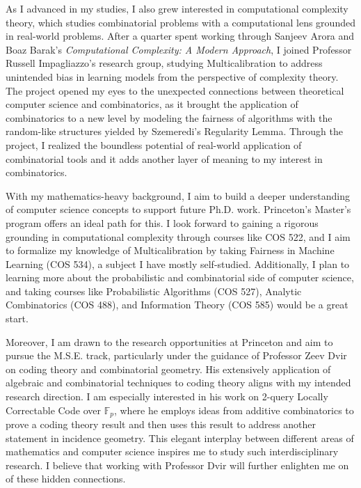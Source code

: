 \documentclass[12pt]{article}
\begin{document}
As I advanced in my studies, I also grew interested in computational complexity theory, which
studies combinatorial problems with a computational lens grounded in real-world problems. After a
quarter spent working through Sanjeev Arora and Boaz Barak's \textit{Computational Complexity: A
Modern Approach}\cite{arora2009computational}, I joined Professor Russell Impagliazzo's research
group, studying Multicalibration to address unintended bias in learning models from the perspective
of complexity theory. The project opened my eyes to the unexpected connections between theoretical
computer science and combinatorics, as it brought the application of combinatorics to a new level by
modeling the fairness of algorithms with the random-like structures yielded by Szemeredi's
Regularity Lemma. Through the project, I realized the boundless potential of real-world application
of combinatorial tools and it adds another layer of meaning to my interest in combinatorics.

With my mathematics-heavy background, I aim to build a deeper understanding of computer science
concepts to support future Ph.D. work. Princeton's Master's program offers an ideal path for this. I
look forward to gaining a rigorous grounding in computational complexity through courses like COS
522, and I aim to formalize my knowledge of Multicalibration by taking Fairness in Machine Learning
(COS 534), a subject I have mostly self-studied. Additionally, I plan to learning more about the
probabilistic and combinatorial side of computer science, and taking courses like Probabilistic
Algorithms (COS 527), Analytic Combinatorics (COS 488), and Information Theory (COS 585) would be a
great start.

Moreover, I am drawn to the research opportunities at Princeton and aim to pursue the M.S.E. track,
particularly under the guidance of Professor Zeev Dvir on coding theory and combinatorial geometry.
His extensively application of algebraic and combinatorial techniques to coding theory aligns with
my intended research direction. I am especially interested in his work on 2-query Locally
Correctable Code over $\mathbb{F}_p$\cite{6108225}, where he employs ideas from additive
combinatorics to prove a coding theory result and then uses this result to address another statement
in incidence geometry. This elegant interplay between different areas of mathematics and computer
science inspires me to study such interdisciplinary research. I believe that working with Professor
Dvir will further enlighten me on of these hidden connections.
\end{document}

